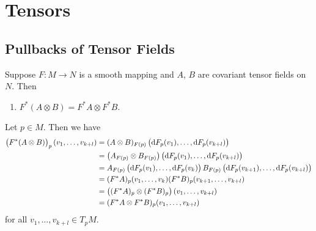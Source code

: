 \chapter{Tensors}
\section{Pullbacks of Tensor Fields}

\begin{exercise}
	Suppose $F: M \to N$ is a smooth mapping and $A$, $B$ are covariant tensor fields on $N$. Then
	\begin{enumerate}[label = (\alph*)]
		\item $F^*(A \otimes B) = F^*A \otimes F^* B$.
	\end{enumerate}
\end{exercise}

\begin{solution}
	Let $p \in M$. Then we have
	\begin{align*}
		\del[1]{F^*(A\otimes B)}_p (v_1,\dots,v_{k + l})&= (A \otimes B)_{F(p)}\del[1]{\d F_p(v_1), \dots, \d F_p(v_{k + l})}\\
		&= \del[1]{A_{F(p)} \otimes B_{F(p)}} \del[1]{\d F_p(v_1), \dots, \d F_p(v_{k + l})}\\
		&= A_{F(p)}\del[1]{\d F_p(v_1), \dots, \d F_p(v_{k})}B_{F(p)}\del[1]{\d F_p(v_{k+1}), \dots, \d F_p(v_{k + l})}\\
		&= (F^* A)_p(v_1,\dots,v_k) (F^* B)_p(v_{k+1},\dots,v_{k + l})\\
		&= \del[1]{(F^* A)_p \otimes (F^* B)_p}(v_1,\dots,v_{k + l})\\
		&= (F^* A \otimes F^* B)_p(v_1,\dots,v_{k + l})
	\end{align*}
	\noindent for all $v_1,\dots,v_{k + l} \in T_pM$.

\end{solution}
